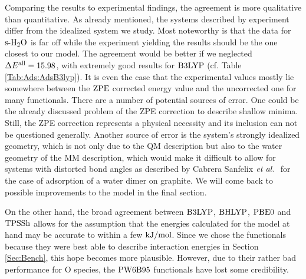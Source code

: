 \documentclass[8.5pt,twoside,twocolumn]{article}
\newcommand\zpe{\enmat{\te{ZPE}}}
\newcommand\eall{\enmat{E^{\te{all}}}}
\newcommand\sur{\enmat{\te{s-}}}
\newcommand\tripot{\enmat{{^3\ot}}}
\newcommand\kmo{\enmat{\te {kJ/mol}}}
\theoremstyle{standard}
\begin{document}
Comparing the results to experimental findings, the agreement is more qualitative
than quantitative. As already mentioned, the systems described by experiment
differ from the idealized system we study. Most noteworthy is that the data for $\sur\hto$
is far off while the experiment yielding the results should be the one closest
to our model. The agreement would be better if we neglected $\Dl\eall=15.98$,
with extremely good results for $\text{B3LYP}$ (cf. Table \ref{Tab:Ads:AdsB3lyp}).
It is even the case that the experimental values mostly lie somewhere between
the $\zpe$ corrected energy value and the uncorrected one for many functionals.
There are a number of potential sources of error. One could be the already
discussed problem of the ZPE correction to describe shallow minima. Still,
the ZPE correction represents a physical necessity and its inclusion can not
be questioned generally.
Another source of error is the system's strongly
idealized geometry, which is not only due to the QM description but also to
the water geometry of the MM description, which would make it difficult to
allow for systems with distorted bond angles as described by Cabrera Sanfelix $\emph{et al.}~$ 
\cite{CabreraSanfelix2003} for the case of adsorption of a water dimer on graphite.
We will come back to possible improvements to the model in the final section.


On the other hand, the broad agreement between $\text{B3LYP}$, $\text{BHLYP}$, $\text{PBE0}$
and $\text{TPSSh}$ allows for the assumption that the energies calculated for the
model at hand may be accurate to within a few $\kmo$. Since we chose
the functionals because they were best able to describe interaction
energies in Section \ref{Sec:Bench}, this hope becomes more plausible.
However, due to their rather bad performance for O species, the $\text{PW6B95}$
functionals have lost some credibility.


\end{document}

